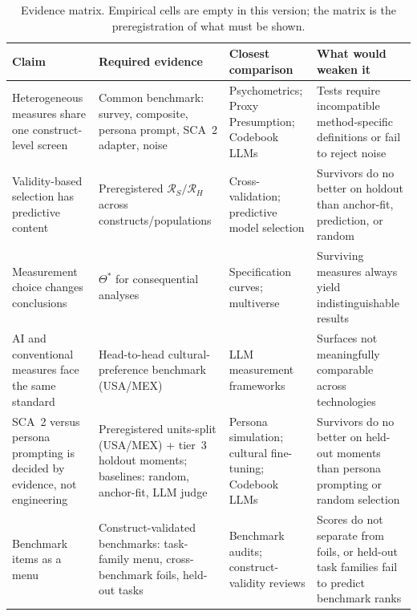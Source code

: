 \documentclass[10pt,letterpaper]{article}
\newcommand{\Rset}{\mathcal{R}}
\begin{document}
\begin{table}[t]
\centering
\footnotesize
\caption{Evidence matrix.
Empirical cells are empty in this version; the matrix is the preregistration of what must be shown.}
\label{tab:evidence}
\begin{tabularx}{\textwidth}{@{}>{\raggedright\arraybackslash}p{2.5cm} >{\raggedright\arraybackslash}p{3.2cm} >{\raggedright\arraybackslash}p{3.0cm} X@{}}
\toprule
\textbf{Claim} & \textbf{Required evidence} & \textbf{Closest comparison} & \textbf{What would weaken it} \\
\midrule
Heterogeneous measures share one construct-level screen & Common benchmark: survey, composite, persona prompt, SCA~2 adapter, noise & Psychometrics; Proxy Presumption; Codebook LLMs & Tests require incompatible method-specific definitions or fail to reject noise \\
Validity-based selection has predictive content & Preregistered $\Rset_S/\Rset_H$ across constructs/populations & Cross-validation; predictive model selection & Survivors do no better on holdout than anchor-fit, prediction, or random \\
Measurement choice changes conclusions & $\Theta^*$ for consequential analyses & Specification curves; multiverse & Surviving measures always yield indistinguishable results \\
AI and conventional measures face the same standard & Head-to-head cultural-preference benchmark (USA/MEX) & LLM measurement frameworks & Surfaces not meaningfully comparable across technologies \\
SCA~2 versus persona prompting is decided by evidence, not engineering & Preregistered units-split (USA/MEX) + tier~3 holdout moments; baselines: random, anchor-fit, LLM judge & Persona simulation; cultural fine-tuning; Codebook LLMs & Survivors do no better on held-out moments than persona prompting or random selection \\
Benchmark items as a menu & Construct-validated benchmarks: task-family menu, cross-benchmark foils, held-out tasks & Benchmark audits; construct-validity reviews & Scores do not separate from foils, or held-out task families fail to predict benchmark ranks \\
\bottomrule
\end{tabularx}
\end{table}

\end{document}
